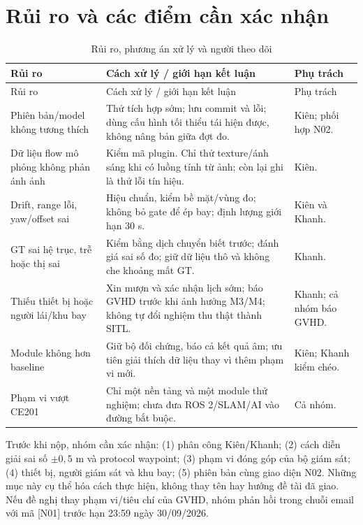 \documentclass[a4paper,12pt]{article}
\newcommand{\tblfont}{\fontsize{11.5}{14}\selectfont\setstretch{1.08}}
\begin{document}
\section{Rủi ro và các điểm cần xác nhận}
\begingroup\tblfont
\begin{longtable}{L{3.3cm}L{6.3cm}L{4.1cm}}
\caption{Rủi ro, phương án xử lý và người theo dõi}\\
\toprule Rủi ro & Cách xử lý / giới hạn kết luận & Phụ trách\\\midrule\endfirsthead
\toprule Rủi ro & Cách xử lý / giới hạn kết luận & Phụ trách\\\midrule\endhead
Phiên bản/model không tương thích & Thử tích hợp sớm; lưu commit và lỗi; dùng cấu hình tối thiểu tái hiện được, không nâng bản giữa đợt đo. & Kiên; phối hợp N02.\\
Dữ liệu flow mô phỏng không phản ánh ảnh & Kiểm mã plugin. Chỉ thử texture/ánh sáng khi có luồng tính từ ảnh; còn lại ghi là thử lỗi tín hiệu. & Kiên.\\
Drift, range lỗi, yaw/offset sai & Hiệu chuẩn, kiểm bề mặt/vùng đo; không bỏ gate để ép bay; định lượng giới hạn 30 s. & Kiên và Khanh.\\
GT sai hệ trục, trễ hoặc thị sai & Kiểm bằng dịch chuyển biết trước; đánh giá sai số đo; giữ dữ liệu thô và không che khoảng mất GT. & Khanh.\\
Thiếu thiết bị hoặc người lái/khu bay & Xin mượn và xác nhận lịch sớm; báo GVHD trước khi ảnh hưởng M3/M4; không tự đổi nghiệm thu thật thành SITL. & Khanh; cả nhóm báo GVHD.\\
Module không hơn baseline & Giữ bộ đối chứng, báo cả kết quả âm; ưu tiên giải thích dữ liệu thay vì thêm phạm vi mới. & Kiên; Khanh kiểm chéo.\\
Phạm vi vượt CE201 & Chỉ một nền tảng và một module thử nghiệm; chưa đưa ROS 2/SLAM/AI vào đường bắt buộc. & Cả nhóm.\\
\bottomrule
\end{longtable}\endgroup

Trước khi nộp, nhóm cần xác nhận: (1) phân công Kiên/Khanh; (2) cách diễn giải sai số $\pm0{,}5$ m và protocol waypoint; (3) phạm vi đóng góp của bộ giám sát; (4) thiết bị, người giám sát và khu bay; (5) phiên bản cùng giao diện N02. Những mục này cụ thể hóa cách thực hiện, không thay tên hay hướng đề tài đã giao. Nếu đề nghị thay phạm vi/tiêu chí của GVHD, nhóm phản hồi trong chuỗi email với mã [N01] trước hạn 23:59 ngày 30/09/2026\cite{assignment}.
\end{document}
